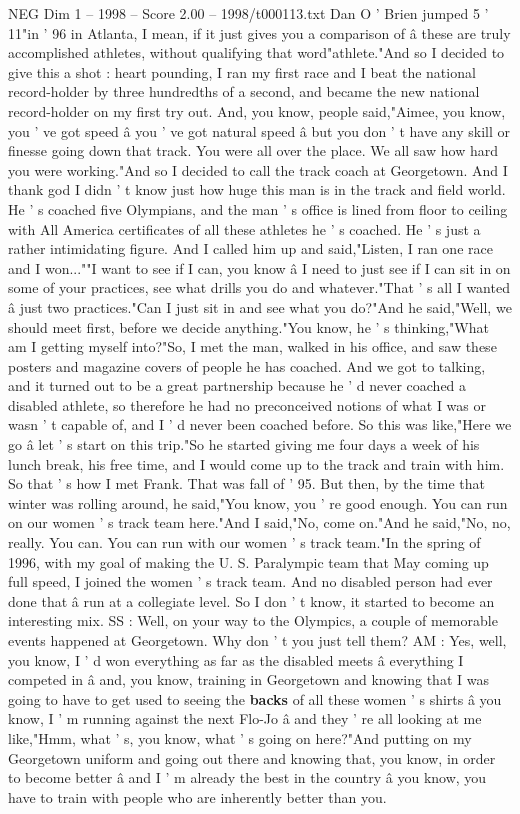 \begin{textsample}{NEG Dim 1 – 1998 – Score 2.00 – 1998/t000113.txt}
Dan O ' Brien jumped 5 ' 11"in ' 96 in Atlanta, I mean, if it just gives you a comparison of â these are truly accomplished athletes, without qualifying that word"athlete."And so I decided to give this a shot : heart pounding, I ran my first race and I beat the national record-holder by three hundredths of a second, and became the new national record-holder on my first try out.
And, you know, people said,"Aimee, you know, you ' ve got speed â you ' ve got natural speed â but you don ' t have any skill or finesse going down that track.
You were all over the place.
We all saw how hard you were working."And so I decided to call the track coach at Georgetown.
And I thank god I didn ' t know just how huge this man is in the track and field world.
He ' s coached five Olympians, and the man ' s office is lined from floor to ceiling with All America certificates of all these athletes he ' s coached.
He ' s just a rather intimidating figure.
And I called him up and said,"Listen, I ran one race and I won...""I want to see if I can, you know â I need to just see if I can sit in on some of your practices, see what drills you do and whatever."That ' s all I wanted â just two practices."Can I just sit in and see what you do?"And he said,"Well, we should meet first, before we decide anything."You know, he ' s thinking,"What am I getting myself into?"So, I met the man, walked in his office, and saw these posters and magazine covers of people he has coached.
And we got to talking, and it turned out to be a great partnership because he ' d never coached a disabled athlete, so therefore he had no preconceived notions of what I was or wasn ' t capable of, and I ' d never been coached before.
So this was like,"Here we go â let ' s start on this trip."So he started giving me four days a week of his lunch break, his free time, and I would come up to the track and train with him.
So that ' s how I met Frank.
That was fall of ' 95.
But then, by the time that winter was rolling around, he said,"You know, you ' re good enough.
You can run on our women ' s track team here."And I said,"No, come on."And he said,"No, no, really.
You can.
You can run with our women ' s track team."In the spring of 1996, with my goal of making the U.
S.
Paralympic team that May coming up full speed, I joined the women ' s track team.
And no disabled person had ever done that â run at a collegiate level.
So I don ' t know, it started to become an interesting mix.
SS : Well, on your way to the Olympics, a couple of memorable events happened at Georgetown.
Why don ' t you just tell them?
AM : Yes, well, you know, I ' d won everything as far as the disabled meets â everything I competed in â and, you know, training in Georgetown and knowing that I was going to have to get used to seeing the \textbf{backs} of all these women ' s shirts â you know, I ' m running against the next Flo-Jo â and they ' re all looking at me like,"Hmm, what ' s, you know, what ' s going on here?"And putting on my Georgetown uniform and going out there and knowing that, you know, in order to become better â and I ' m already the best in the country â you know, you have to train with people who are inherently better than you.

\end{textsample}
